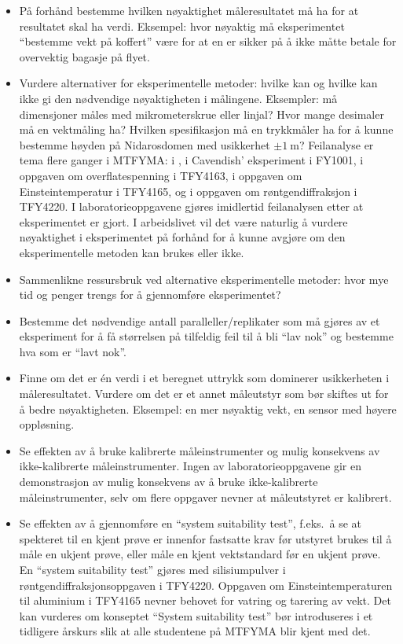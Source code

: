 \documentclass{article}
\begin{document}
\begin{itemize}
    \begin{itemize}
      \item På forhånd bestemme hvilken nøyaktighet måleresultatet må ha for at resultatet skal ha verdi. Eksempel: hvor nøyaktig må eksperimentet ``bestemme vekt på koffert'' være for at en er sikker på å ikke måtte betale for overvektig bagasje på flyet.
      \item Vurdere alternativer for eksperimentelle metoder: hvilke kan og hvilke kan ikke gi den nødvendige nøyaktigheten i målingene. Eksempler: må dimensjoner måles med mikrometerskrue eller linjal? Hvor mange desimaler må en vektmåling ha? Hvilken spesifikasjon må en trykkmåler ha for å kunne bestemme høyden på Nidarosdomen med usikkerhet $\pm\SI{1}{\meter}$? Feilanalyse er tema flere ganger i MTFYMA: i \cite{Persson2020}, i Cavendish’ eksperiment i FY1001, i oppgaven om overflatespenning i TFY4163, i oppgaven om Einsteintemperatur i TFY4165, og i oppgaven om røntgendiffraksjon i TFY4220. I laboratorieoppgavene gjøres imidlertid feilanalysen etter at eksperimentet er gjort. I arbeidslivet vil det være naturlig å vurdere nøyaktighet i eksperimentet på forhånd for å kunne avgjøre om den eksperimentelle metoden kan brukes eller ikke.
      \item Sammenlikne ressursbruk ved alternative eksperimentelle metoder: hvor mye tid og penger trengs for å gjennomføre eksperimentet?
      \item Bestemme det nødvendige antall paralleller/replikater som må gjøres av et eksperiment for å få størrelsen på tilfeldig feil til å bli ``lav nok'' og bestemme hva som er ``lavt nok''.
      \item Finne om det er én verdi i et beregnet uttrykk som dominerer usikkerheten i måleresultatet. Vurdere om det er et annet måleutstyr som bør skiftes ut for å bedre nøyaktigheten. Eksempel: en mer nøyaktig vekt, en sensor med høyere oppløsning.
      \item Se effekten av å bruke kalibrerte måleinstrumenter og mulig konsekvens av ikke-kalibrerte måleinstrumenter. Ingen av laboratorieoppgavene gir en demonstrasjon av mulig konsekvens av å bruke ikke-kalibrerte måleinstrumenter, selv om flere oppgaver nevner at måleutstyret er kalibrert.
      \item Se effekten av å gjennomføre en ``system suitability test'', f.eks.~å se at spekteret til en kjent prøve er innenfor fastsatte krav før utstyret brukes til å måle en ukjent prøve, eller måle en kjent vektstandard før en ukjent prøve.  En ``system suitability test'' gjøres med silisiumpulver i røntgendiffraksjonsoppgaven i TFY4220. Oppgaven om Einsteintemperaturen til aluminium i TFY4165 nevner behovet for vatring og tarering av vekt. Det kan vurderes om konseptet ``System suitability test'' bør introduseres i et tidligere årskurs slik at alle studentene på MTFYMA blir kjent med det.

\end{itemize}
\end{itemize}
\end{document}
